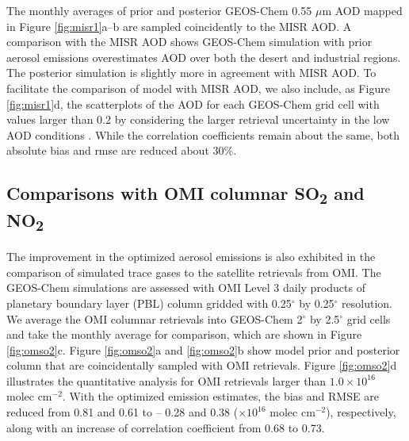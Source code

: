  The monthly averages of prior and posterior GEOS-Chem 0.55 $\mu$m AOD
 mapped in Figure \ref{fig:misr1}a--b are sampled coincidently to the MISR AOD.
 A comparison with the MISR AOD shows GEOS-Chem simulation with prior aerosol emissions
 overestimates AOD over both the desert and industrial regions.
 The posterior simulation is slightly more in agreement with MISR AOD.
 To facilitate the comparison of model with MISR AOD, we also include, as Figure \ref{fig:misr1}d,
 the scatterplots of the AOD for each GEOS-Chem grid cell with values larger than 0.2
 by considering the larger retrieval uncertainty in the low AOD conditions \citep{kahn05,kahn10}.
 While the correlation coefficients remain about the same,
 both absolute bias and rmse are reduced about 30\%.

 \subsection{Comparisons with OMI columnar SO\textsubscript{2} and NO\textsubscript{2}}

 The improvement in the optimized aerosol emissions is also exhibited
 in the comparison of simulated trace gases to the satellite retrievals from OMI.
 The GEOS-Chem  simulations are assessed with OMI Level 3 daily products
 of planetary boundary layer (PBL)  column gridded
 with 0.25$^{\circ}$ by 0.25$^{\circ}$ resolution.
 We average the OMI  columnar retrievals into GEOS-Chem 2$^{\circ}$ by 2.5$^{\circ}$ grid cells
 and take the monthly average for comparison, which are shown in Figure \ref{fig:omso2}c.
 Figure \ref{fig:omso2}a and \ref{fig:omso2}b show model prior and posterior  column
 that are coincidentally sampled with OMI retrievals.
 Figure \ref{fig:omso2}d illustrates the quantitative analysis for OMI  retrievals
 larger than $1.0 \times 10^{16}$ molec cm$^{-2}$.
 With the optimized emission estimates, the bias and RMSE are reduced
 from 0.81 and 0.61 to – 0.28 and 0.38 ($\times 10^{16}$ molec cm$^{-2}$), respectively,
 along with an increase of correlation coefficient from 0.68 to 0.73. 

